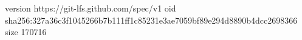 version https://git-lfs.github.com/spec/v1
oid sha256:327a36c3f1045266b7b111ff1c85231e3ae7059bf89e294d8890b4dcc2698366
size 170716
